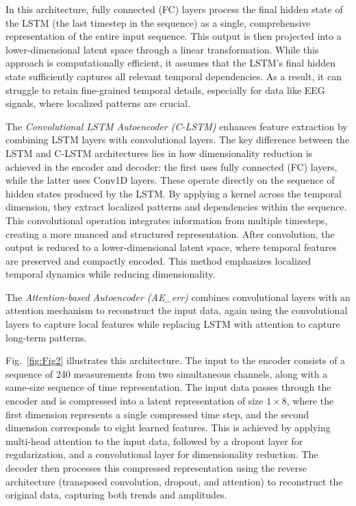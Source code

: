 \documentclass[runningheads]{llncs}
\begin{document}
In this architecture, fully connected (FC) layers process the final
hidden state of the LSTM (the last timestep in the sequence) as a
single, comprehensive representation of the entire input
sequence. This output is then projected into a lower-dimensional
latent space through a linear transformation. While this approach is
computationally efficient, it assumes that the LSTM's final hidden
state sufficiently captures all relevant temporal dependencies. As a
result, it can struggle to retain fine-grained temporal details,
especially for data like EEG signals, where localized patterns are
crucial.

The \emph{Convolutional LSTM Autoencoder (C-LSTM)} enhances feature
extraction by combining LSTM layers with convolutional layers. The
key difference between the LSTM and C-LSTM architectures lies in how
dimensionality reduction is achieved in the encoder and decoder: the
first uses fully connected (FC) layers, while the latter uses
Conv1D layers. These operate directly on the sequence of hidden states
produced by the LSTM. By applying a kernel across the temporal
dimension, they extract localized patterns and dependencies within the
sequence. This convolutional operation integrates information from
multiple timesteps, creating a more nuanced and structured
representation. After convolution, the output is reduced to a
lower-dimensional latent space, where temporal features are preserved
and compactly encoded. This method emphasizes localized temporal
dynamics while reducing dimensionality.

The \emph{Attention-based Autoencoder (AE\_err)}
combines convolutional layers with an attention mechanism to
reconstruct the input data, again using the convolutional layers to
capture local features while replacing LSTM with attention to capture
long-term patterns.

Fig.~\ref{fig:Fig2} illustrates this architecture. The input to the
encoder consists of a sequence of 240 measurements from two
simultaneous channels, along with a same-size sequence of time
representation. The input data passes through the encoder and is
compressed into a latent representation of size \( 1 \times 8 \),
where the first dimension represents a single compressed time step,
and the second dimension corresponds to eight learned features. This
is achieved by applying multi-head attention to the input data,
followed by a dropout layer for regularization, and a convolutional
layer for dimensionality reduction. The decoder then processes this
compressed representation using the reverse architecture (transposed
convolution, dropout, and attention) to reconstruct the original data,
capturing both trends and amplitudes.
\end{document}
